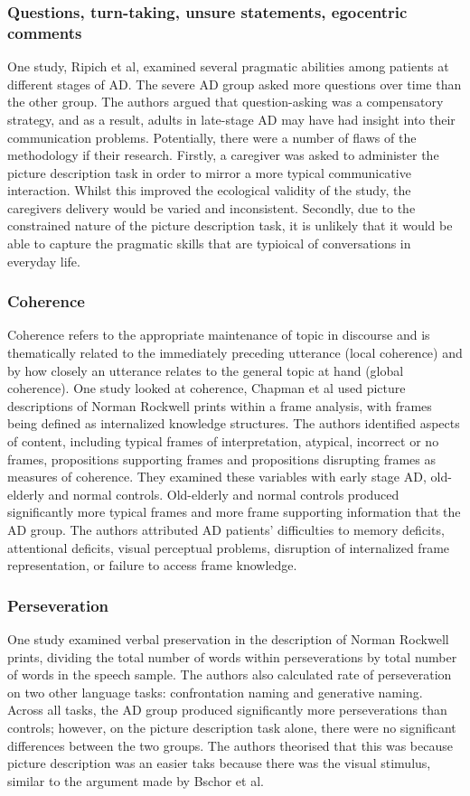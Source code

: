 \documentclass[12pt, twoside, a4paper]{article}
\begin{document}
\subsubsection{Questions, turn-taking, unsure statements, egocentric comments}
One study, Ripich et al, examined several pragmatic abilities among patients at different stages of AD. The severe AD group asked more questions over time than the other group. The authors argued that question-asking was a compensatory strategy, and as a result, adults in late-stage AD may have had insight into their communication problems. Potentially, there were a number of flaws of the methodology if their research. Firstly, a caregiver was asked to administer the picture description task in order to mirror a more typical communicative interaction. Whilst this improved the ecological validity of the study, the caregivers delivery would be varied and inconsistent. Secondly, due to the constrained nature of the picture description task, it is unlikely that it would be able to capture the pragmatic skills that are typioical of conversations in everyday life.
\par
\subsubsection{Coherence}
Coherence refers to the appropriate maintenance of topic in discourse and is thematically related to the immediately preceding utterance (local coherence) and by how closely an utterance relates to the general topic at hand (global coherence). One study looked at coherence, Chapman et al used picture descriptions of Norman Rockwell prints within a frame analysis, with frames being defined as internalized knowledge structures. The authors identified aspects of content, including typical frames of interpretation, atypical, incorrect or no frames, propositions supporting frames and propositions disrupting frames as measures of coherence. They examined these variables with early stage AD, old-elderly and normal controls. Old-elderly and normal controls produced significantly more typical frames and more frame supporting information that the AD group. The authors attributed AD patients' difficulties to memory deficits, attentional deficits, visual perceptual problems, disruption of internalized frame representation, or failure to access frame knowledge.
\par
\subsubsection{Perseveration}
One study examined verbal preservation in the description of Norman Rockwell prints, dividing the total number of words within perseverations by total number of words in the speech sample. The authors also calculated rate of perseveration on two other language tasks: confrontation naming and generative naming. Across all tasks, the AD group produced significantly more perseverations than controls; however, on the picture description task alone, there were no significant differences between the two groups. The authors theorised that this was because picture description was an easier taks because there was the visual stimulus, similar to the argument made by Bschor et al.
\par
\end{document}

